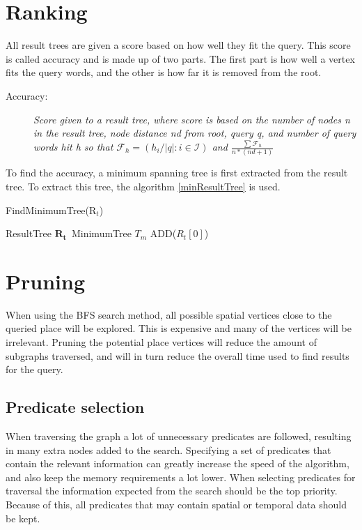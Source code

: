 \section{Ranking}
All result trees are given a score based on how well they fit the query. This score is called accuracy and is made up of two parts. The first part is how well a vertex fits the query words, and the other is how far it is removed from the root.
\begin{description}
    \item[Accuracy:] {\em Score given to a result tree, where score is based on the number of nodes n in the result tree, node distance nd from root, query q, and number of query words hit h so that $\mathcal{F}_h = (h_i/\left\lvert q \right\rvert : i \in \mathcal{I})$ and $ \frac{\sum \mathcal{F}_h}{n*(nd+1)}$}
\end{description}
To find the accuracy, a minimum spanning tree is first extracted from the result tree. To extract this tree, the algorithm \ref{minResultTree} is used.
\begin{algorithm}
    \caption{FindMinimumTree(R$_t$)}
    \label{minResultTree}
    \SetAlgoLined
    ResultTree $\mathbf{R_t}$\ MinimumTree $T_m$ ADD($R_t[0]$)\;
\end{algorithm}

\section{Pruning}
\label{pruning}
When using the BFS search method, all possible spatial vertices close to the queried place will be explored. This is expensive and many of the vertices will be irrelevant. Pruning the potential place vertices will reduce the amount of subgraphs traversed, and will in turn reduce the overall time used to find results for the query.

\subsection{Predicate selection}
When traversing the graph a lot of unnecessary predicates are followed, resulting in many extra nodes added to the search. Specifying a set of predicates that contain the relevant information can greatly increase the speed of the algorithm, and also keep the memory requirements a lot lower. When selecting predicates for traversal the information expected from the search should be the top priority. Because of this, all predicates that may contain spatial or temporal data should be kept.

